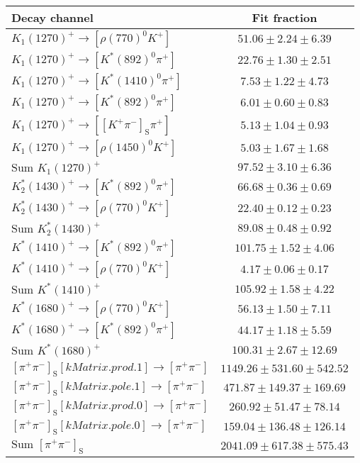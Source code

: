 \begin{tabular}{l c} 
\hline
\hline
Decay channel &  Fit fraction  \\ 
\hline
$K_{1}(1270)^{+}\rightarrow \left[\rho(770)^{0}K^{+}\right]$ & $51.06 \pm 2.24 \pm 6.39$ \\ 
$K_{1}(1270)^{+}\rightarrow \left[K^{*}(892)^{0}\pi^{+}\right]$ & $22.76 \pm 1.30 \pm 2.51$ \\ 
$K_{1}(1270)^{+}\rightarrow \left[K^{*}(1410)^{0}\pi^{+}\right]$ & $7.53 \pm 1.22 \pm 4.73$ \\ 
$K_{1}(1270)^{+}\rightarrow \left[K^{*}(892)^{0}\pi^{+}\right]$ & $6.01 \pm 0.60 \pm 0.83$ \\ 
$K_{1}(1270)^{+}\rightarrow \left[\left[K^{+}\pi^{-}\right]_{\text{S}}\pi^{+}\right]$ & $5.13 \pm 1.04 \pm 0.93$ \\ 
$K_{1}(1270)^{+}\rightarrow \left[\rho(1450)^{0}K^{+}\right]$ & $5.03 \pm 1.67 \pm 1.68$ \\ 
$\text{Sum } K_{1}(1270)^{+}$ & $97.52 \pm 3.10 \pm 6.36$ \\ 
$K_{2}^{*}(1430)^{+}\rightarrow \left[K^{*}(892)^{0}\pi^{+}\right]$ & $66.68 \pm 0.36 \pm 0.69$ \\ 
$K_{2}^{*}(1430)^{+}\rightarrow \left[\rho(770)^{0}K^{+}\right]$ & $22.40 \pm 0.12 \pm 0.23$ \\ 
$\text{Sum } K_{2}^{*}(1430)^{+}$ & $89.08 \pm 0.48 \pm 0.92$ \\ 
$K^{*}(1410)^{+}\rightarrow \left[K^{*}(892)^{0}\pi^{+}\right]$ & $101.75 \pm 1.52 \pm 4.06$ \\ 
$K^{*}(1410)^{+}\rightarrow \left[\rho(770)^{0}K^{+}\right]$ & $4.17 \pm 0.06 \pm 0.17$ \\ 
$\text{Sum } K^{*}(1410)^{+}$ & $105.92 \pm 1.58 \pm 4.22$ \\ 
$K^{*}(1680)^{+}\rightarrow \left[\rho(770)^{0}K^{+}\right]$ & $56.13 \pm 1.50 \pm 7.11$ \\ 
$K^{*}(1680)^{+}\rightarrow \left[K^{*}(892)^{0}\pi^{+}\right]$ & $44.17 \pm 1.18 \pm 5.59$ \\ 
$\text{Sum } K^{*}(1680)^{+}$ & $100.31 \pm 2.67 \pm 12.69$ \\ 
$\left[\pi^{+}\pi^{-}\right]_{\text{S}}\left[kMatrix.prod.1\right]\rightarrow \left[\pi^{+}\pi^{-}\right]$ & $1149.26 \pm 531.60 \pm 542.52$ \\ 
$\left[\pi^{+}\pi^{-}\right]_{\text{S}}\left[kMatrix.pole.1\right]\rightarrow \left[\pi^{+}\pi^{-}\right]$ & $471.87 \pm 149.37 \pm 169.69$ \\ 
$\left[\pi^{+}\pi^{-}\right]_{\text{S}}\left[kMatrix.prod.0\right]\rightarrow \left[\pi^{+}\pi^{-}\right]$ & $260.92 \pm 51.47 \pm 78.14$ \\ 
$\left[\pi^{+}\pi^{-}\right]_{\text{S}}\left[kMatrix.pole.0\right]\rightarrow \left[\pi^{+}\pi^{-}\right]$ & $159.04 \pm 136.48 \pm 126.14$ \\ 
$\text{Sum } \left[\pi^{+}\pi^{-}\right]_{\text{S}}$ & $2041.09 \pm 617.38 \pm 575.43$ \\ 
\hline
\hline
\end{tabular}
